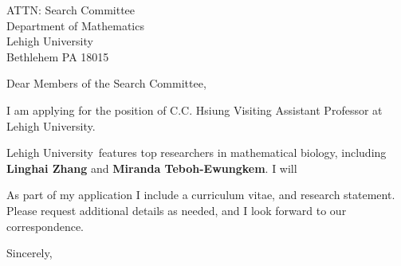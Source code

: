\documentclass[11pt,a4paper]{letter}
\begin{document}

\def\School{Lehigh University}

\begin{letter}
{ATTN: Search Committee\\
Department of Mathematics\\
Lehigh University\\
Bethlehem PA 18015
}


\opening{Dear Members of the Search Committee,}

I am applying for the position of C.C. Hsiung Visiting Assistant Professor at \School. 



\School~features top researchers in mathematical biology, including \textbf{Linghai Zhang} and \textbf{Miranda Teboh-Ewungkem}. I will 



As part of my application I include a curriculum vitae, and research statement. Please request additional details as needed, and I look forward to our correspondence.

\closing{Sincerely,}
\end{letter}
\end{document}
